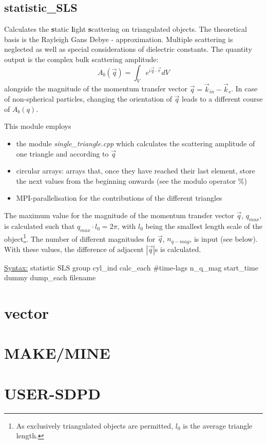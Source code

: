\subsection{statistic\_SLS}

Calculates the \textbf{s}tatic \textbf{l}ight \textbf{s}cattering on triangulated objects. The theoretical basis is the Rayleigh Gans Debye - approximation. Multiple scattering is neglected as well as special considerations of dielectric constants. The quantity output is the complex bulk scattering amplitude:
%
\begin{equation}
\label{eq:SLS}
A_b(\vec{q})=\int_V e^{i\vec{q} \cdot \vec{r}} dV
\end{equation}
%
alongside the magnitude of the momentum transfer vector $\vec{q} = \vec{k}_{in} - \vec{k}_{s}$. In case of non-spherical particles, changing the orientation of $\vec{q}$ leads to a different course of $A_b(q)$.

This module employs
%
\begin{itemize}
\item the module \textit{single\_triangle.cpp} which calculates the scattering amplitude of one triangle and according to $\vec{q}$
\item circular arrays: arrays that, once they have reached their last element, store the next values from the beginning onwards (see the modulo operator \%)
\item MPI-parallelisation for the contributions of the different triangles
\end{itemize}
%
The maximum value for the magnitude of the momentum transfer vector $\vec{q}$, $q_{max}$, is calculated such that $q_{max} \cdot l_0 = 2 \pi$, with $l_0$ being the smallest length scale of the object\footnote{As exclusively triangulated objects are permitted, $l_0$ is the average triangle length.}. The number of different magnitudes for $\vec{q}$, $n_{q-mag}$, is input (see below). With these values, the difference of adjacent $|\vec{q}|$s is calculated.

\underline{Syntax:} statistic	SLS group cyl\_ind calc\_each \#time-lags n\_q\_mag start\_time dummy dump\_each filename

\section{vector}


\section{MAKE/MINE}


\section{USER-SDPD}



% 
